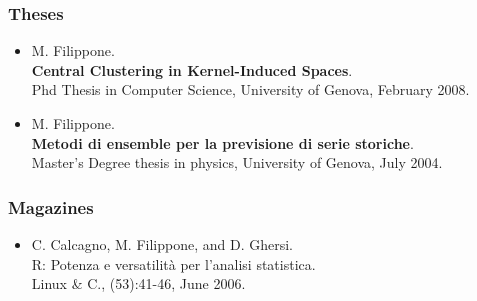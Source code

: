\documentclass[a4paper,10pt]{article}
\begin{document}
\subsubsection*{Theses}
\begin{itemize}
      \item M. Filippone.
	\\\textbf{Central Clustering in Kernel-Induced Spaces}.
	\\Phd Thesis in Computer Science, University of Genova, February 2008.
      \item M. Filippone.
	\\\textbf{Metodi di ensemble per la previsione di serie storiche}.
	\\Master's Degree thesis in physics, University of Genova, July 2004.
\end{itemize}

\subsubsection*{Magazines}
\begin{itemize}
      \item C. Calcagno, M. Filippone, and D. Ghersi.
	\\R: Potenza e versatilit\`a per l'analisi statistica.
	\\Linux \& C., (53):41-46, June 2006.
\end{itemize}
\end{document}
